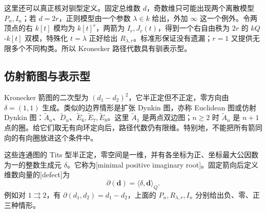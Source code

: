 \ProseParagraphBreak
这里还可以真正核对驯型定义。固定总维数 \(d\)，奇数维只可能出现两个离散模型 \(P_n,I_n\)；若 \(d=2r\)，正则模型由一个参数 \(\lambda\in k\) 给出，外加 \(\infty\) 这一个例外。令两顶点的右 \(k[t]\) 模均为 \(k[t]^r\)，两箭为 \(I_r,J_r(t)\)，得到一个右自由秩为 \(2r\) 的 \(kQ\)-\(k[t]\) 双模，特殊化 \(t=\lambda\) 正好给出 \(R_{\lambda,r}\)。标准形保证没有遗漏；\(r=1\) 又提供无限多个不同构类。所以 Kronecker 路径代数具有驯表示型。

\subsection{仿射箭图与表示型}
\label{b5:subsec:1007:03}

Kronecker 箭图的二次型为 \((d_1-d_2)^2\)，它半正定但不正定，零方向由 \(\delta=(1,1)\) 生成。类似的边界情形是扩张 Dynkin 图，亦称 Euclidean 图或仿射 Dynkin 图：\(\widetilde A_n\)、\(\widetilde D_n\)、\(\widetilde E_6,\widetilde E_7,\widetilde E_8\)。这里 \(\widetilde A_1\) 是两点双边图；\(n\ge2\) 时 \(\widetilde A_n\) 是 \(n+1\) 点的圈。给它们取无有向环定向后，路径代数仍有限维。特别地，不能把所有箭同向的有向圈放进这个条件中。

\ProseParagraphBreak
这些连通图的 Tits 型半正定，零空间是一维，并有各坐标为正、坐标最大公因数为一的整数生成元 \(\delta\)。它称为[minimal positive imaginary root]。固定箭向后定义维数向量的[defect]为
\[
	\partial(\mathbf d)=\langle\delta,\mathbf d\rangle_Q.
\]
例如对 \(1\rightrightarrows2\)，有 \(\partial(d_1,d_2)=d_1-d_2\)，上面的 \(P_n,R_{\lambda,r},I_n\) 分别给出负、零、正三种情形。

